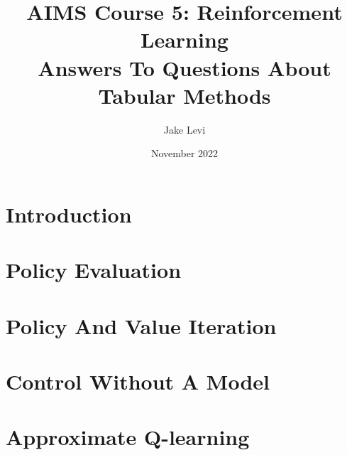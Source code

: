 \documentclass{article}
\title{
    AIMS Course 5: Reinforcement Learning \\
    \large Answers To Questions About Tabular Methods
}
\author{Jake Levi}
\date{November 2022}
\begin{document}
\maketitle
\section{Introduction} \label{section:intro}

\section{Policy Evaluation}

\section{Policy And Value Iteration}

\section{Control Without A Model}

\section{Approximate Q-learning}



\end{document}
